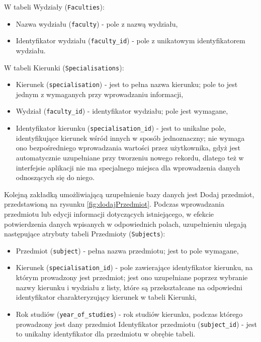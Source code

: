 W tabeli Wydziały (\verb!Faculties!):

\begin{itemize}
\item Nazwa wydziału (\verb!faculty!) - pole z nazwą wydziału,
\item Identyfikator wydziału (\verb!faculty_id!) - pole z unikatowym identyfikatorem wydziału.
\end{itemize}

W tabeli Kierunki (\verb!Specialisations!):

\begin{itemize}

\item Kierunek (\verb!specialisation!) - jest to pełna nazwa kierunku; pole to jest jednym z wymaganych przy wprowadzaniu informacji,
\item Wydział (\verb!faculty_id!) - identyfikator wydziału; pole jest wymagane,
\item Identyfikator kierunku (\verb!specialisation_id!) - jest to unikalne pole, identyfikujące kierunek wśród innych w sposób jednoznaczny; nie wymaga ono bezpośredniego wprowadzania wartości przez użytkownika, gdyż jest automatycznie uzupełniane przy tworzeniu nowego rekordu, dlatego też w interfejsie aplikacji nie ma specjalnego miejsca dla wprowadzenia danych odnoszących się do niego.
\end{itemize}
Kolejną zakładką umożliwiającą uzupełnienie bazy danych jest Dodaj przedmiot, przedstawioną na rysunku \ref{fig:dodajPrzedmiot}. Podczas wprowadzania przedmiotu lub edycji informacji dotyczących istniejącego, w efekcie potwierdzenia danych wpisanych w odpowiednich polach, uzupełnieniu ulegają następujące atrybuty tabeli Przedmioty (\verb!Subjects!):
\begin{itemize}
\item Przedmiot (\verb!subject!) - pełna nazwa przedmiotu; jest to pole wymagane,
\item Kierunek (\verb!specialisation_id!) - pole zawierające identyfikator kierunku, na którym prowadzony jest przedmiot; jest ono uzupełniane poprzez wybranie nazwy kierunku i wydziału z listy, które są przekształcane na odpowiedni identyfikator charakteryzujący kierunek w tabeli Kierunki,
\item Rok studiów (\verb!year_of_studies!) - rok studiów kierunku, podczas którego prowadzony jest dany przedmiot
Identyfikator przedmiotu (\verb!subject_id!) - jest to unikalny identyfikator dla przedmiotu w obrębie tabeli.
\end{itemize}

